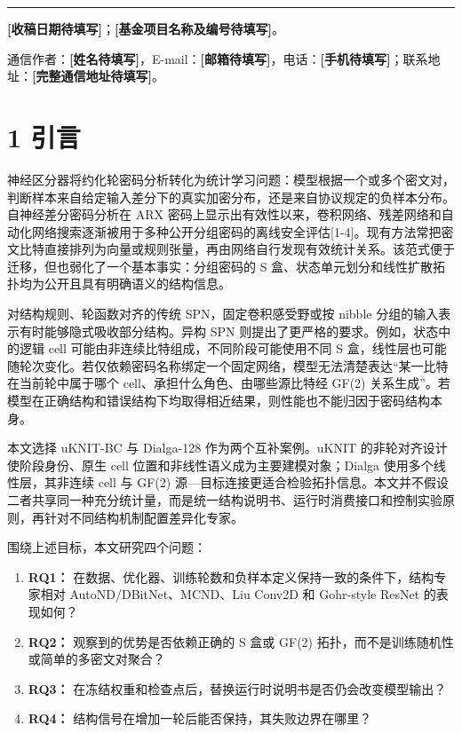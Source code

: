 \documentclass{templates/cjc-utf8}
\providecommand{\tightlist}{%
  \setlength{\itemsep}{0pt}\setlength{\parskip}{0pt}}
\newcommand{\placeholder}[1]{\textbf{[#1待填写]}}
\begin{document}
\vspace{2mm}
\enlargethispage{20mm}
\noindent\rule{45mm}{0.4pt}\par
{\placeholder{收稿日期}；\placeholder{基金项目名称及编号}。\par
通信作者：\placeholder{姓名}，E-mail：\placeholder{邮箱}，电话：\placeholder{手机}；联系地址：\placeholder{完整通信地址}。}

\clearpage
\twocolumn

\hypertarget{ux5f15ux8a00}{%
\section{1 引言}\label{ux5f15ux8a00}}

神经区分器将约化轮密码分析转化为统计学习问题：模型根据一个或多个密文对，判断样本来自给定输入差分下的真实加密分布，还是来自协议规定的负样本分布。自神经差分密码分析在
ARX
密码上显示出有效性以来，卷积网络、残差网络和自动化网络搜索逐渐被用于多种公开分组密码的离线安全评估{[}1-4{]}。现有方法常把密文比特直接排列为向量或规则张量，再由网络自行发现有效统计关系。该范式便于迁移，但也弱化了一个基本事实：分组密码的
S 盒、状态单元划分和线性扩散拓扑均为公开且具有明确语义的结构信息。

对结构规则、轮函数对齐的传统 SPN，固定卷积感受野或按 nibble
分组的输入表示有时能够隐式吸收部分结构。异构 SPN
则提出了更严格的要求。例如，状态中的逻辑 cell
可能由非连续比特组成，不同阶段可能使用不同 S
盒，线性层也可能随轮次变化。若仅依赖密码名称绑定一个固定网络，模型无法清楚表达``某一比特在当前轮中属于哪个
cell、承担什么角色、由哪些源比特经 GF(2)
关系生成''。若模型在正确结构和错误结构下均取得相近结果，则性能也不能归因于密码结构本身。

本文选择 uKNIT-BC 与 Dialga-128 作为两个互补案例。uKNIT
的非轮对齐设计使阶段身份、原生 cell
位置和非线性语义成为主要建模对象；Dialga 使用多个线性层，其非连续 cell
与 GF(2)
源---目标连接更适合检验拓扑信息。本文并不假设二者共享同一种充分统计量，而是统一结构说明书、运行时消费接口和控制实验原则，再针对不同结构机制配置差异化专家。

围绕上述目标，本文研究四个问题：

\begin{enumerate}
\def\labelenumi{\arabic{enumi}.}
\tightlist
\item
  \textbf{RQ1：}
  在数据、优化器、训练轮数和负样本定义保持一致的条件下，结构专家相对
  AutoND/DBitNet、MCND、Liu Conv2D 和 Gohr-style ResNet 的表现如何？
\item
  \textbf{RQ2：} 观察到的优势是否依赖正确的 S 盒或 GF(2)
  拓扑，而不是训练随机性或简单的多密文对聚合？
\item
  \textbf{RQ3：}
  在冻结权重和检查点后，替换运行时说明书是否仍会改变模型输出？
\item
  \textbf{RQ4：} 结构信号在增加一轮后能否保持，其失败边界在哪里？
\end{enumerate}
\end{document}
